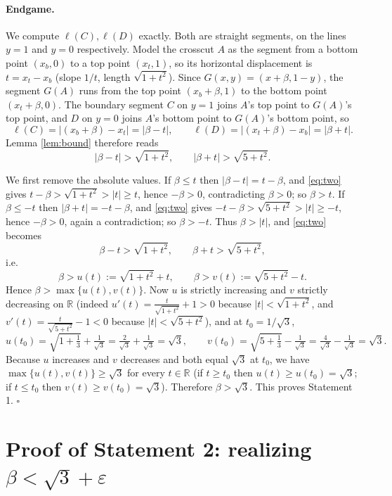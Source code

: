 \documentclass[12pt]{article}
\newcommand{\R}{\mathbb{R}}
\newcommand{\eps}{\varepsilon}
\begin{document}
\paragraph{Endgame.} We compute $\ell(C),\ell(D)$ exactly. Both are
straight segments, on the lines $y=1$ and $y=0$ respectively. Model the
crosscut $A$ as the segment from a bottom point $(x_b,0)$ to a top point
$(x_t,1)$, so its horizontal displacement is $t=x_t-x_b$ (slope $1/t$,
length $\sqrt{1+t^2}$). Since $G(x,y)=(x+\beta,1-y)$, the segment $G(A)$
runs from the top point $(x_b+\beta,1)$ to the bottom point
$(x_t+\beta,0)$. The boundary segment $C$ on $y=1$ joins $A$'s top point
to $G(A)$'s top point, and $D$ on $y=0$ joins $A$'s bottom point to
$G(A)$'s bottom point, so
\[
\ell(C)=\big|(x_b+\beta)-x_t\big|=|\beta-t|,\qquad
\ell(D)=\big|(x_t+\beta)-x_b\big|=|\beta+t|.
\]
Lemma \ref{lem:bound} therefore reads
\begin{equation}\label{eq:two}
|\beta-t|>\sqrt{1+t^2},\qquad |\beta+t|>\sqrt{5+t^2}.
\end{equation}

We first remove the absolute values. If $\beta\le t$ then
$|\beta-t|=t-\beta$, and \eqref{eq:two} gives
$t-\beta>\sqrt{1+t^2}>|t|\ge t$, hence $-\beta>0$, contradicting
$\beta>0$; so $\beta>t$. If $\beta\le -t$ then $|\beta+t|=-t-\beta$, and
\eqref{eq:two} gives $-t-\beta>\sqrt{5+t^2}>|t|\ge -t$, hence
$-\beta>0$, again a contradiction; so $\beta>-t$. Thus $\beta>|t|$, and
\eqref{eq:two} becomes
\[
\beta-t>\sqrt{1+t^2},\qquad \beta+t>\sqrt{5+t^2},
\]
i.e.
\[
\beta>u(t):=\sqrt{1+t^2}+t,\qquad \beta>v(t):=\sqrt{5+t^2}-t .
\]
Hence $\beta>\max\{u(t),v(t)\}$. Now $u$ is strictly increasing and $v$
strictly decreasing on $\R$ (indeed $u'(t)=\tfrac{t}{\sqrt{1+t^2}}+1>0$
because $|t|<\sqrt{1+t^2}$, and $v'(t)=\tfrac{t}{\sqrt{5+t^2}}-1<0$
because $|t|<\sqrt{5+t^2}$), and at $t_0=1/\sqrt3$,
\[
u(t_0)=\sqrt{1+\tfrac13}+\tfrac1{\sqrt3}=\tfrac{2}{\sqrt3}+\tfrac1{\sqrt3}
=\sqrt3,\qquad
v(t_0)=\sqrt{5+\tfrac13}-\tfrac1{\sqrt3}=\tfrac{4}{\sqrt3}-\tfrac1{\sqrt3}
=\sqrt3 .
\]
Because $u$ increases and $v$ decreases and both equal $\sqrt3$ at $t_0$,
we have $\max\{u(t),v(t)\}\ge\sqrt3$ for every $t\in\R$ (if $t\ge t_0$
then $u(t)\ge u(t_0)=\sqrt3$; if $t\le t_0$ then $v(t)\ge v(t_0)=\sqrt3$).
Therefore $\beta>\sqrt3$. This proves Statement 1. \hfill$\square$

\section{Proof of Statement 2: realizing $\beta<\sqrt3+\eps$}
\label{sec:S2}
\end{document}
